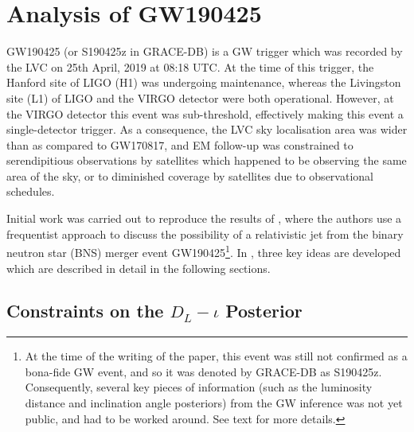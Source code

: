 \section{Analysis of GW190425}\label{sec:190425}

    GW190425 (or S190425z in GRACE-DB) is a GW trigger which was recorded by the LVC on
    25th April, 2019 at 08:18 UTC. At the time of this trigger, the Hanford site of LIGO
    (H1) was undergoing maintenance, whereas the Livingston site (L1) of LIGO and the
    VIRGO detector were both operational. However, at the VIRGO detector this event was
    sub-threshold, effectively making this event a single-detector trigger. As a
    consequence, the LVC sky localisation area was wider than as compared to GW170817,
    and EM follow-up was constrained to serendipitious observations by satellites which
    happened to be observing the same area of the sky, or to diminished coverage by
    satellites due to observational schedules.

    Initial work was carried out to reproduce the results of \cite{saleem_2020B}, where
    the authors use a frequentist approach to discuss the possibility of a relativistic
    jet from the binary neutron star (BNS) merger event GW190425\footnote{
        At the time of the writing of the paper, this event was still not confirmed as a
        bona-fide GW event, and so it was denoted by GRACE-DB as S190425z. Consequently,
        several key pieces of information (such as the luminosity distance and
        inclination angle posteriors) from the GW inference was not yet public, and had
        to be worked around. See text for more details.
    }. In \cite{saleem_2020B}, three key ideas  are developed which are described in
    detail in the following sections.

    \subsection{Constraints on the \texorpdfstring{$D_L-\iota$}{dL-iota} Posterior}
    \label{sec:dl-iota_posterior}

